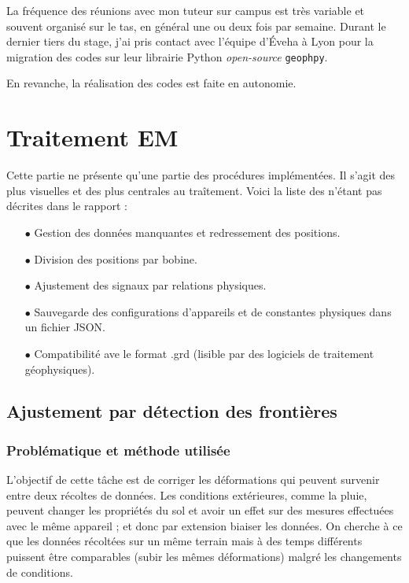 \documentclass[12pt]{article}
\begin{document}
    La fréquence des réunions avec mon tuteur sur campus est très variable et souvent organisé sur le tas, en général une ou deux fois par semaine. Durant le dernier tiers du stage, j'ai pris contact avec l'équipe d'Éveha à Lyon pour la migration des codes sur leur librairie Python \textit{open-source} \texttt{geophpy}.

    En revanche, la réalisation des codes est faite en autonomie.

\newpage
\section{Traitement EM}

    Cette partie ne présente qu'une partie des procédures implémentées. Il s'agit des plus visuelles et des plus centrales au traîtement. Voici la liste des n'étant pas décrites dans le rapport :
    \begin{enumerate}
        \item[$\bullet$] Gestion des données manquantes et redressement des positions.
        \item[$\bullet$] Division des positions par bobine.
        \item[$\bullet$] Ajustement des signaux par relations physiques.
        \item[$\bullet$] Sauvegarde des configurations d'appareils et de constantes physiques dans un fichier JSON.
        \item[$\bullet$] Compatibilité ave le format .grd (lisible par des logiciels de traitement géophysiques).

    \end{enumerate}

\subsection{Ajustement par détection des frontières}\label{2-front}
\subsubsection{Problématique et méthode utilisée}
    L'objectif de cette tâche est de corriger les déformations qui peuvent survenir entre deux récoltes de données. Les conditions extérieures, comme la pluie, peuvent changer les propriétés du sol et avoir un effet sur des mesures effectuées avec le même appareil ; et donc par extension biaiser les données. On cherche à ce que les données récoltées sur un même terrain mais à des temps différents puissent être comparables (subir les mêmes déformations) malgré les changements de conditions.
\end{document}
